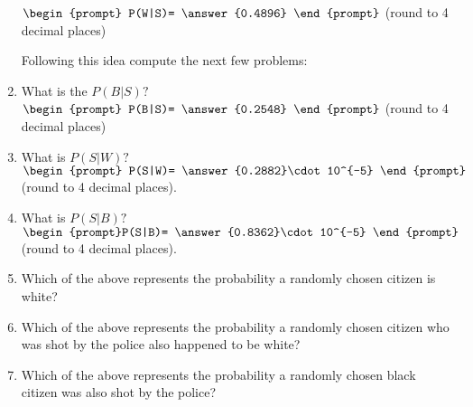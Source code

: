 \documentclass{ximera}
\begin{document}
\begin{question}
\begin{enumerate}
$\begin{prompt}
    P(W|S)= \answer{0.4896}
  \end{prompt}$ (round to 4 decimal places)
  
  Following this idea compute the next few problems:
  
  
\item What is the $P(B|S)?$ $\begin{prompt}
    P(B|S)= \answer{0.2548}
  \end{prompt}$ (round to 4 decimal places)

\item What is $P(S|W)?$ $\begin{prompt} P(S|W)= \answer{0.2882}\cdot 10^{-5} \end{prompt}$ (round to 4 decimal places).
\item What is $P(S|B)?$ $\begin{prompt}P(S|B)= \answer{0.8362}\cdot 10^{-5} \end{prompt}$ (round to 4 decimal places).

\item Which of the above represents the probability a randomly chosen citizen is white?

  \begin{multipleChoice}
  \end{multipleChoice}

\item Which of the above represents the probability a randomly chosen citizen who was shot by the police also happened to be white?

  \begin{multipleChoice}
  \end{multipleChoice}

\item Which of the above represents the probability a randomly chosen black citizen  was also  shot by the police?

  \begin{multipleChoice}
  \end{multipleChoice}
  
\end{enumerate}

\end{question}
\end{document}
